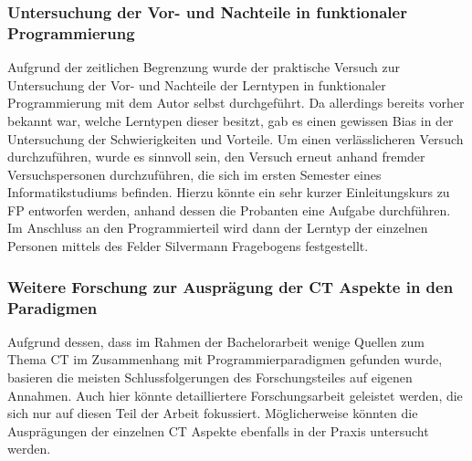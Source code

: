 \subsubsection{Untersuchung der Vor- und Nachteile in funktionaler Programmierung}
Aufgrund der zeitlichen Begrenzung wurde der praktische Versuch zur Untersuchung der Vor- und Nachteile der Lerntypen in funktionaler Programmierung mit dem Autor selbst durchgeführt. Da allerdings bereits vorher bekannt war, welche Lerntypen dieser besitzt, gab es einen gewissen Bias in der Untersuchung der Schwierigkeiten und Vorteile.
Um einen verlässlicheren Versuch durchzuführen, wurde es sinnvoll sein, den Versuch erneut anhand fremder Versuchspersonen durchzuführen, die sich im ersten Semester eines Informatikstudiums befinden.
Hierzu könnte ein sehr kurzer Einleitungskurs zu FP entworfen werden, anhand dessen die Probanten eine Aufgabe durchführen. Im Anschluss an den Programmierteil wird dann der Lerntyp der einzelnen Personen mittels des Felder Silvermann Fragebogens festgestellt.

\subsubsection{Weitere Forschung zur Ausprägung der CT Aspekte in den Paradigmen}
Aufgrund dessen, dass im Rahmen der Bachelorarbeit wenige Quellen zum Thema CT im Zusammenhang mit Programmierparadigmen gefunden wurde, basieren die meisten Schlussfolgerungen des Forschungsteiles auf eigenen Annahmen.
Auch hier könnte detailliertere Forschungsarbeit geleistet werden, die sich nur auf diesen Teil der Arbeit fokussiert. Möglicherweise könnten die Ausprägungen der einzelnen CT Aspekte ebenfalls in der Praxis untersucht werden.

